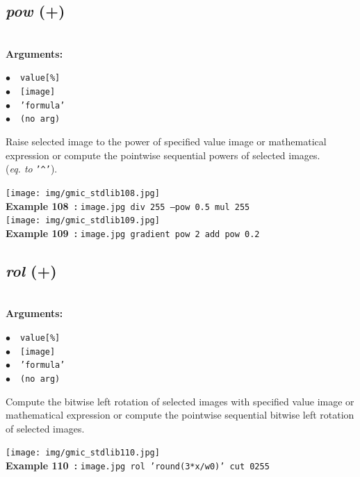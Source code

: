 \documentclass[a4paper,10.5pt,twoside]{book}
\def\comma{\discretionary{,}{}{,}}
\newcommand{\Cb}[1]{\textcolor{cb}{#1}}
\begin{document}
\subsection{\emph{pow} (+)}\vspace*{-0.7em}
~\\\textbf{\Cb{Arguments: }}\begin{flushleft}
{\small \Cb{\hspace*{0.5cm}$\bullet$~~\texttt{value[\%]}}}~~~\\
{\small \Cb{\hspace*{0.5cm}$\bullet$~~\texttt{[image]}}}~~~\\
{\small \Cb{\hspace*{0.5cm}$\bullet$~~\texttt{'formula'}}}~~~\\
{\small \Cb{\hspace*{0.5cm}$\bullet$~~\texttt{(no arg)}}}\end{flushleft}
Raise selected image to the power of specified value{\comma} image or mathematical
expression{\comma} or compute the pointwise sequential powers of selected images.
~\\(\emph{eq. to} {\small \texttt{'\textasciicircum '}}).
\begin{center}\texttt{[image: img/gmic\_stdlib108.jpg]}\\
{\footnotesize \textbf{Example 108~:} \texttt{image.jpg div 255 --pow 0.5 mul 255}}
\\\texttt{[image: img/gmic\_stdlib109.jpg]}\\
{\footnotesize \textbf{Example 109~:} \texttt{image.jpg gradient pow 2 add pow 0.2}}
\end{center}

\subsection{\emph{rol} (+)}\vspace*{-0.7em}
~\\\textbf{\Cb{Arguments: }}\begin{flushleft}
{\small \Cb{\hspace*{0.5cm}$\bullet$~~\texttt{value[\%]}}}~~~\\
{\small \Cb{\hspace*{0.5cm}$\bullet$~~\texttt{[image]}}}~~~\\
{\small \Cb{\hspace*{0.5cm}$\bullet$~~\texttt{'formula'}}}~~~\\
{\small \Cb{\hspace*{0.5cm}$\bullet$~~\texttt{(no arg)}}}\end{flushleft}
Compute the bitwise left rotation of selected images with specified value{\comma} image or
mathematical expression{\comma} or compute the pointwise sequential bitwise left rotation of
selected images.
\begin{center}\texttt{[image: img/gmic\_stdlib110.jpg]}\\
{\footnotesize \textbf{Example 110~:} \texttt{image.jpg rol 'round(3*x/w{\comma}0)' cut 0{\comma}255}}
\end{center}
\end{document}
